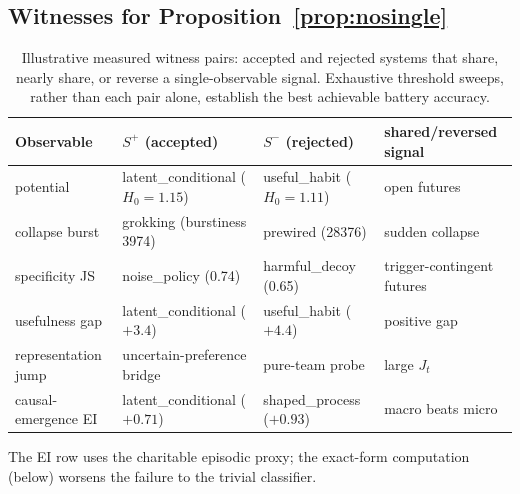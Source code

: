 \documentclass[11pt]{article}
\theoremstyle{definition}
\begin{document}
\subsection*{Witnesses for Proposition~\ref{prop:nosingle}}
\begin{table}[h]
\centering\scriptsize
\caption{Illustrative measured witness pairs: accepted and rejected
systems that share, nearly share, or reverse a single-observable
signal. Exhaustive threshold sweeps, rather than each pair alone,
establish the best achievable battery accuracy.}
\label{tab:witnesses}
\begin{tabular}{llll}
\toprule
\textbf{Observable} & $S^{+}$ (accepted) & $S^{-}$ (rejected) & shared/reversed signal \\
\midrule
potential & latent\_conditional ($H_0 = 1.15$) & useful\_habit ($H_0 = 1.11$) & open futures \\
collapse burst & grokking (burstiness 3974) & prewired (28376) & sudden collapse \\
specificity JS & noise\_policy (0.74) & harmful\_decoy (0.65) & trigger-contingent futures \\
usefulness gap & latent\_conditional ($+3.4$) & useful\_habit ($+4.4$) & positive gap \\
representation jump & uncertain-preference bridge & pure-team probe & large $J_t$ \\
causal-emergence EI & latent\_conditional ($+0.71$) & shaped\_process ($+0.93$) & macro beats micro \\
\bottomrule
\end{tabular}
\end{table}
The EI row uses the charitable episodic proxy; the exact-form
computation (below) worsens the failure to the trivial classifier.
\end{document}
